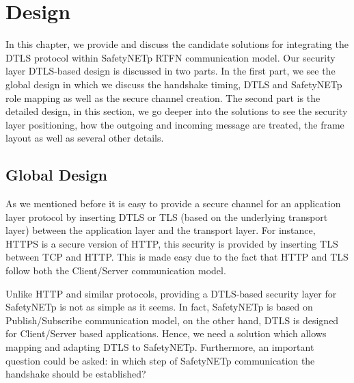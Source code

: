 %
%
%
%
%

\chapter{Design}


In this chapter, we provide and discuss the candidate solutions for integrating the DTLS
protocol within SafetyNETp RTFN communication model. Our security layer DTLS-based design is
discussed in two parts. In the first part, we see the global design in which we discuss
the handshake timing, DTLS and SafetyNETp role mapping as well as the secure channel creation.
The second part is the detailed design, in this section, we go deeper into the solutions to
see the security layer positioning, how the outgoing and incoming message are treated,
the frame layout as well as several other details.

\section{Global Design}

As we mentioned before it is easy to provide a secure channel for an application layer
protocol by inserting DTLS or TLS (based on the underlying transport layer) between the application
layer and the transport layer. For instance, \ac{HTTPS} is a secure version
of \ac{HTTP}, this security is provided by inserting TLS between TCP and \ac{HTTP}. This is made easy due to the
fact that \ac{HTTP} and TLS follow both the Client/Server communication model.

Unlike \ac{HTTP} and similar protocols, providing a DTLS-based security layer for SafetyNETp is not as simple as it seems.
In fact, SafetyNETp is based on Publish/Subscribe communication model, on the other hand, DTLS is designed for
Client/Server based applications. Hence, we need a solution which allows mapping and adapting
DTLS to SafetyNETp. Furthermore, an important question could be asked: in which step of SafetyNETp
communication the handshake should be established?

